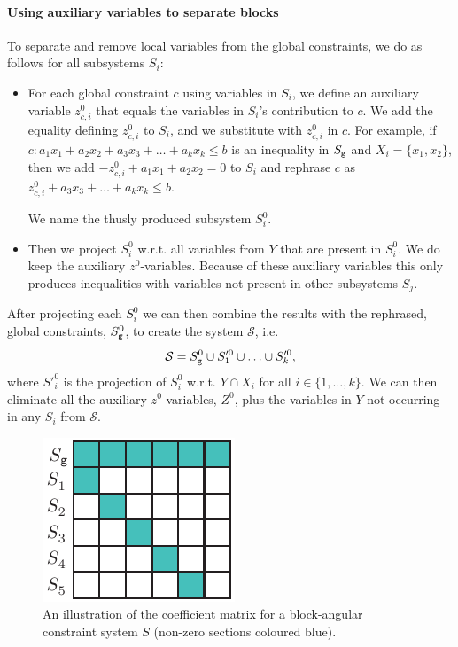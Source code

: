 \paragraph{Using auxiliary variables to separate blocks}  
To separate and remove local variables from the global constraints, we do as follows for all subsystems $S_i$:
\begin{itemize}\itemsep0em
\item For each global constraint $c$ using variables in $S_i$, we define an auxiliary variable $z^0_{c,i}$ that equals the variables in $S_i$'s contribution to $c$. We add the equality defining $z^0_{c,i}$ to $S_i$, and we substitute with $z^0_{c,i}$ in $c$. For example, if $c: a_1x_1 + a_2x_2 + a_3x_3 + \ldots + a_kx_k \leq b$ is an inequality in $S_{\texttt{g}}$ and $X_i = \{x_1,x_2\}$, then we add $-z^0_{c,i} + a_1x_1 + a_2x_2 = 0$ to $S_i$ and rephrase $c$ as $z^0_{c,i} + a_3x_3 + \ldots + a_kx_k \leq b$. 

We name the thusly produced subsystem $S_i^0$. 
\item Then we project $S_i^0$ w.r.t. all variables from $Y$ that are present in $S_i^0$. We do keep the auxiliary $z^0$-variables. 
Because of these auxiliary variables this only produces inequalities with variables not present in other subsystems $S_j$. 
\end{itemize}
After projecting each $S_i^0$ we can then combine the results with the rephrased, global constraints, $S_{\texttt{g}}^0$, to create the system $\mathcal{S}$, i.e. 
\[
\mathcal{S} = S^0_{\texttt{g}} \cup S'^0_1\cup \ldots \cup S'^0_k,
\]
where $S'^0_i$ is the projection of $S^0_i$ w.r.t. $Y\cap X_i$ for all $i\in\{1,\ldots, k\}$.
We can then eliminate all the auxiliary $z^0$-variables, $Z^0$, plus the variables in $Y$ not occurring in any $S_i$ from $\mathcal{S}$. %

\begin{figure}[htbp]
	\centering
		\includegraphics{figures/recursiveProjectionEs(a).pdf}
	\caption{An illustration of the coefficient matrix for a block-angular constraint system $S$ (non-zero sections coloured blue).}
	\label{fig:decomp}
\end{figure}

